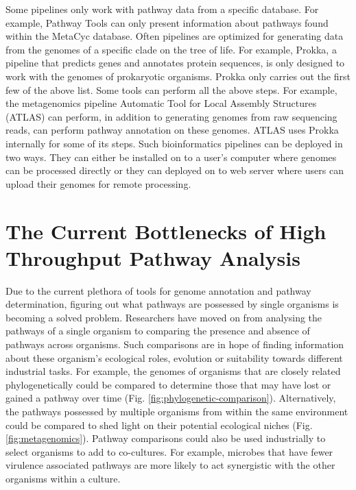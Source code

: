 Some pipelines only work with pathway data from a specific database. For example, Pathway Tools can only present information about pathways found within the MetaCyc database. Often pipelines are optimized for generating data from the genomes of a specific clade on the tree of life. For example, Prokka, a pipeline that predicts genes and annotates protein sequences, is only designed to work with the genomes of prokaryotic organisms. Prokka only carries out the first few of the above list. Some tools can perform all the above steps. For example, the metagenomics pipeline Automatic Tool for Local Assembly Structures (ATLAS) can perform, in addition to generating genomes from raw sequencing reads, can perform pathway annotation on these genomes. ATLAS uses Prokka internally for some of its steps. Such bioinformatics pipelines can be deployed in two ways. They can either be installed on to a user's computer where genomes can be processed directly or they can deployed on to web server where users can upload their genomes for remote processing.

\section{The Current Bottlenecks of High Throughput Pathway Analysis}

Due to the current plethora of tools for genome annotation and pathway determination, figuring out what pathways are possessed by single organisms is becoming a solved problem. Researchers have moved on from analysing the pathways of a single organism to comparing the presence and absence of pathways across organisms. Such comparisons are in hope of finding information about these organism's ecological roles, evolution or suitability towards different industrial tasks. For example, the genomes of organisms that are closely related phylogenetically could be compared to determine those that may have lost or gained a pathway over time (Fig. \ref{fig:phylogenetic-comparison}). Alternatively, the pathways possessed by multiple organisms from within the same environment could be compared to shed light on their potential ecological niches (Fig. \ref{fig:metagenomics}). Pathway comparisons could also be used industrially to select organisms to add to co-cultures. For example, microbes that have fewer virulence associated pathways are more likely to act synergistic with the other organisms within a culture.

